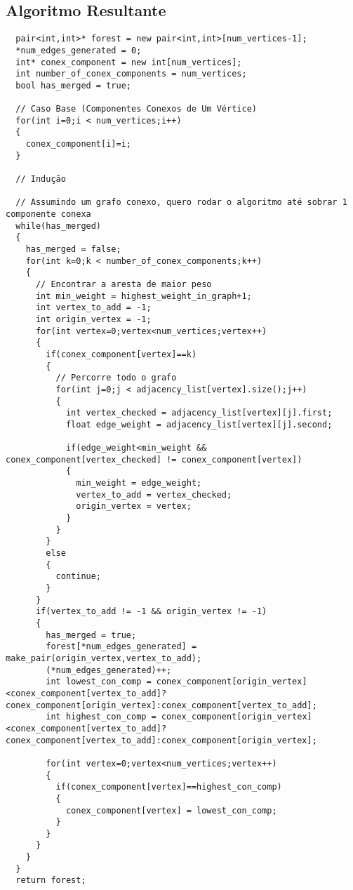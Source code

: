 \documentclass[12pt]{article}
\begin{document}
\subsection{ Algoritmo Resultante }
\begin{lstlisting}
  pair<int,int>* forest = new pair<int,int>[num_vertices-1];
  *num_edges_generated = 0;
  int* conex_component = new int[num_vertices];
  int number_of_conex_components = num_vertices;
  bool has_merged = true;

  // Caso Base (Componentes Conexos de Um Vértice)
  for(int i=0;i < num_vertices;i++)
  {
    conex_component[i]=i;
  }

  // Indução

  // Assumindo um grafo conexo, quero rodar o algoritmo até sobrar 1 componente conexa
  while(has_merged)
  {
    has_merged = false;
    for(int k=0;k < number_of_conex_components;k++)
    {
      // Encontrar a aresta de maior peso
      int min_weight = highest_weight_in_graph+1;
      int vertex_to_add = -1;
      int origin_vertex = -1;
      for(int vertex=0;vertex<num_vertices;vertex++)
      {
        if(conex_component[vertex]==k)
        {
          // Percorre todo o grafo
          for(int j=0;j < adjacency_list[vertex].size();j++)
          {
            int vertex_checked = adjacency_list[vertex][j].first;
            float edge_weight = adjacency_list[vertex][j].second;

            if(edge_weight<min_weight && conex_component[vertex_checked] != conex_component[vertex])
            {
              min_weight = edge_weight;
              vertex_to_add = vertex_checked;
              origin_vertex = vertex;
            }
          }
        }
        else
        {
          continue;
        }
      }
      if(vertex_to_add != -1 && origin_vertex != -1)
      {
        has_merged = true;
        forest[*num_edges_generated] = make_pair(origin_vertex,vertex_to_add);
        (*num_edges_generated)++;
        int lowest_con_comp = conex_component[origin_vertex]<conex_component[vertex_to_add]?conex_component[origin_vertex]:conex_component[vertex_to_add];
        int highest_con_comp = conex_component[origin_vertex]<conex_component[vertex_to_add]?conex_component[vertex_to_add]:conex_component[origin_vertex];

        for(int vertex=0;vertex<num_vertices;vertex++)
        {
          if(conex_component[vertex]==highest_con_comp)
          {
            conex_component[vertex] = lowest_con_comp;
          }
        }
      }
    }
  }
  return forest;
\end{lstlisting}
\end{document}
